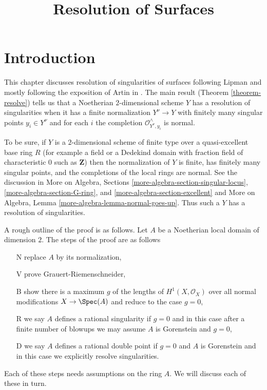 

%


\title{Resolution of Surfaces}


\maketitle

\label{section-phantom}

\tableofcontents

\section{Introduction}
\label{section-introduction}

\noindent
This chapter discusses resolution of singularities of surfaces
following Lipman \cite{Lipman} and mostly following the exposition of
Artin in \cite{Artin-Lipman}. The main result
(Theorem \ref{theorem-resolve}) tells us that a Noetherian
$2$-dimensional scheme $Y$ has a resolution of singularities when
it has a finite normalization $Y^\nu \to Y$ with
finitely many singular points $y_i \in Y^\nu$ and for each $i$ the completion
$\mathcal{O}_{Y^\nu, y_i}^\wedge$ is normal.

\medskip\noindent
To be sure, if $Y$ is a $2$-dimensional scheme of finite type over
a quasi-excellent base ring $R$ (for example a field or a
Dedekind domain with fraction field of characteristic $0$
such as $\mathbf{Z}$) then the normalization of $Y$ is finite,
has finitely many singular points, and the completions of the
local rings are normal. See the discussion in
More on Algebra, Sections
\ref{more-algebra-section-singular-locus},
\ref{more-algebra-section-G-ring}, and
\ref{more-algebra-section-excellent}
and
More on Algebra, Lemma \ref{more-algebra-lemma-normal-goes-up}.
Thus such a $Y$ has a resolution of singularities.

\medskip\noindent
A rough outline of the proof is as follows. Let $A$ be a
Noetherian local domain of dimension $2$. The steps of the proof
are as follows
\begin{enumerate}
\item[N] replace $A$ by its normalization,
\item[V] prove Grauert-Riemenschneider,
\item[B] show there is a maximum $g$ of the lengths of
$H^1(X, \mathcal{O}_X)$ over all normal modifications $X \to \Spec(A)$
and reduce to the case $g = 0$,
\item[R] we say $A$ defines a rational singularity if $g = 0$
and in this case after a finite number of
blowups we may assume $A$ is Gorenstein and $g = 0$,
\item[D] we say $A$ defines a rational double point if
$g = 0$ and $A$ is Gorenstein and in this case we
explicitly resolve singularities.
\end{enumerate}
Each of these steps needs assumptions on the ring $A$.
We will discuss each of these in turn.

